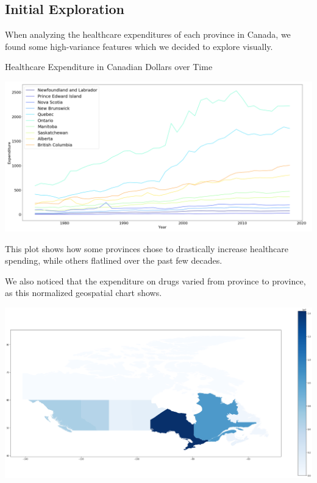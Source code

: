 \documentclass[preprint,12pt]{elsarticle}
\begin{document}
\subsection{Initial Exploration}

When analyzing the healthcare expenditures of each province in Canada, we found some high-variance features which we decided to explore visually.

\begin{center}
    \caption{Healthcare Expenditure in Canadian Dollars over Time}
    \includegraphics[scale=0.35]{images/expenditure_time.png}
\end{center}

This plot shows how some provinces chose to drastically increase healthcare spending, while others flatlined over the past few decades. 

We also noticed that the expenditure on drugs varied from province to province, as this normalized geospatial chart shows.
\begin{center}
    
\includegraphics[scale=0.17]{images/Population_map.png}

\end{center}
\end{document}
